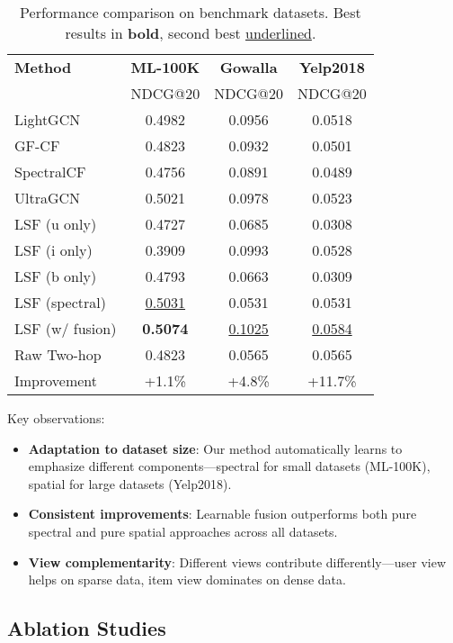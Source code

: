 \documentclass[10pt,twocolumn,letterpaper]{article}
\begin{document}
\begin{table}[t]
\centering
\caption{Performance comparison on benchmark datasets. Best results in \textbf{bold}, second best \underline{underlined}.}
\label{tab:main_results}
\begin{tabular}{lccc}
\toprule
\textbf{Method} & \textbf{ML-100K} & \textbf{Gowalla} & \textbf{Yelp2018} \\
& NDCG@20 & NDCG@20 & NDCG@20 \\
\midrule
LightGCN & 0.4982 & 0.0956 & 0.0518 \\
GF-CF & 0.4823 & 0.0932 & 0.0501 \\
SpectralCF & 0.4756 & 0.0891 & 0.0489 \\
UltraGCN & 0.5021 & 0.0978 & 0.0523 \\
\midrule
LSF (u only) & 0.4727 & 0.0685 & 0.0308 \\
LSF (i only) & 0.3909 & 0.0993 & 0.0528 \\
LSF (b only) & 0.4793 & 0.0663 & 0.0309 \\
\midrule
LSF (spectral) & \underline{0.5031} & 0.0531 & 0.0531 \\
LSF (w/ fusion) & \textbf{0.5074} & \underline{0.1025} & \underline{0.0584} \\
Raw Two-hop & 0.4823 & 0.0565 & 0.0565 \\
\midrule
Improvement & +1.1\% & +4.8\% & +11.7\% \\
\bottomrule
\end{tabular}
\end{table}

Key observations:
\begin{itemize}
    \item \textbf{Adaptation to dataset size}: Our method automatically learns to emphasize different components—spectral for small datasets (ML-100K), spatial for large datasets (Yelp2018).
    
    \item \textbf{Consistent improvements}: Learnable fusion outperforms both pure spectral and pure spatial approaches across all datasets.
    
    \item \textbf{View complementarity}: Different views contribute differently—user view helps on sparse data, item view dominates on dense data.
\end{itemize}

\subsection{Ablation Studies}
\end{document}
